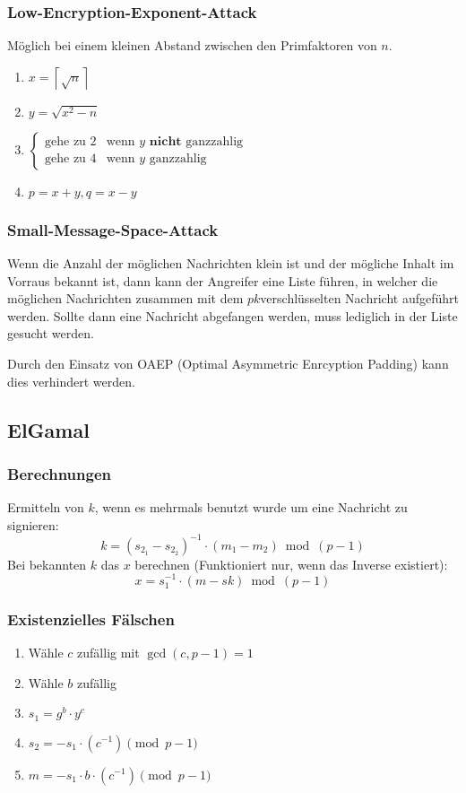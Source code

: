 \documentclass[a4paper,landscape]{article}
\newcommand{\plaint}{\ensuremath{m}}
\newcommand{\skey}{\ensuremath{sk}}
\newcommand{\pkey}{\ensuremath{pk}}
\begin{document}
\begin{multicols*}{4}
	\subsubsection*{Low-Encryption-Exponent-Attack}
	Möglich bei einem kleinen Abstand zwischen den Primfaktoren von \(n\).
	\begin{enumerate}
		\item \(x = \left\lceil\sqrt{n}\right\rceil\)
		\item \(y = \sqrt{x^{2}-n}\)
		\item \(
		      \begin{cases}
			      \text{gehe zu 2} & \text{wenn } y \textbf{ nicht}\text{ ganzzahlig} \\
			      \text{gehe zu 4} & \text{wenn } y \text{ ganzzahlig}
		      \end{cases}\)
		\item \(p = x+y, q = x-y\)
	\end{enumerate}

	\subsubsection*{Small-Message-Space-Attack}
	Wenn die Anzahl der möglichen Nachrichten klein ist und der mögliche Inhalt
	im Vorraus bekannt ist, dann kann der Angreifer eine Liste führen, in welcher
	die möglichen Nachrichten zusammen mit dem \pkey verschlüsselten Nachricht
	aufgeführt werden. Sollte dann eine Nachricht abgefangen werden, muss lediglich
	in der Liste gesucht werden. \par
	Durch den Einsatz von OAEP (Optimal Asymmetric Enrcyption Padding) kann dies
	verhindert werden.

	\subsection{ElGamal}
	\subsubsection*{Berechnungen}
	Ermitteln von \(k\), wenn es mehrmals benutzt wurde um eine Nachricht zu
	signieren:
	\[k = (s_{2_1} - s_{2_2})^{-1} \cdot (\plaint_{1} - \plaint_{2}) \bmod (p-1)\]
	Bei bekannten \(k\) das \(x\) berechnen (Funktioniert nur, wenn das Inverse
	existiert):
	\[x = s_{1}^{-1} \cdot (\plaint - \skey) \bmod (p-1)\]

	\subsubsection*{Existenzielles Fälschen}
	\begin{enumerate}
		\item Wähle \(c\) zufällig mit \(\gcd(c,p-1) = 1\)
		\item Wähle \(b\) zufällig
		\item \(s_{1} = g^{b} \cdot y^{c}\)
		\item \(s_{2} = -s_{1} \cdot (c^{-1}) \pmod{p-1}\)
		\item \(m = -s_{1} \cdot b \cdot (c^{-1}) \pmod{p-1}\)
	\end{enumerate}


\end{multicols*}
\end{document}
